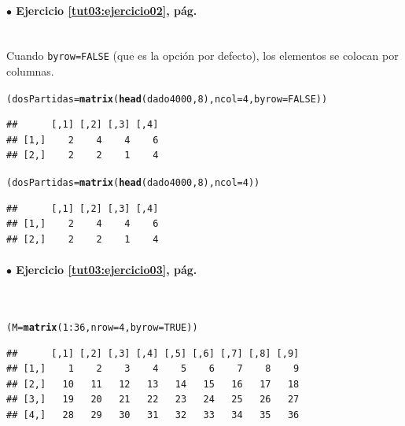 \documentclass[10pt,a4paper]{article}\usepackage[]{graphicx}\usepackage[]{color}
\makeatletter
\newcommand{\hlnum}[1]{\textcolor[rgb]{0.686,0.059,0.569}{#1}}%
\newcommand{\hlopt}[1]{\textcolor[rgb]{0,0,0}{#1}}%
\newcommand{\hlstd}[1]{\textcolor[rgb]{0.345,0.345,0.345}{#1}}%
\newcommand{\hlkwb}[1]{\textcolor[rgb]{0.69,0.353,0.396}{#1}}%
\newcommand{\hlkwc}[1]{\textcolor[rgb]{0.333,0.667,0.333}{#1}}%
\newcommand{\hlkwd}[1]{\textcolor[rgb]{0.737,0.353,0.396}{\textbf{#1}}}%
\newenvironment{kframe}{%
 \def\at@end@of@kframe{}%
 \ifinner\ifhmode%
  \def\at@end@of@kframe{\end{minipage}}%
  \begin{minipage}{\columnwidth}%
 \fi\fi%
 \def\FrameCommand##1{\hskip\@totalleftmargin \hskip-\fboxsep
 \colorbox{shadecolor}{##1}\hskip-\fboxsep
     \hskip-\linewidth \hskip-\@totalleftmargin \hskip\columnwidth}%
 \MakeFramed {\advance\hsize-\width
   \@totalleftmargin\z@ \linewidth\hsize
   \@setminipage}}%
 {\par\unskip\endMakeFramed%
 \at@end@of@kframe}
\newenvironment{knitrout}{}{} %
\makeatother
\begin{document}
\paragraph{\bf $\bullet$ Ejercicio \ref{tut03:ejercicio02}, pág. \pageref{tut03:ejercicio02}}
\label{tut03:ejercicio02:sol}\quad\\

Cuando {\tt byrow=FALSE} (que es la opción por defecto), los elementos se colocan por columnas.
\begin{knitrout}
\color{fgcolor}\begin{kframe}
\begin{alltt}
\hlstd{(dosPartidas} \hlkwb{=} \hlkwd{matrix}\hlstd{(}\hlkwd{head}\hlstd{(dado4000,} \hlnum{8}\hlstd{),} \hlkwc{ncol} \hlstd{=} \hlnum{4}\hlstd{,} \hlkwc{byrow} \hlstd{=} \hlnum{FALSE}\hlstd{))}
\end{alltt}
\begin{verbatim}
##      [,1] [,2] [,3] [,4]
## [1,]    2    4    4    6
## [2,]    2    2    1    4
\end{verbatim}
\begin{alltt}
\hlstd{(dosPartidas} \hlkwb{=} \hlkwd{matrix}\hlstd{(}\hlkwd{head}\hlstd{(dado4000,} \hlnum{8}\hlstd{),} \hlkwc{ncol} \hlstd{=} \hlnum{4}\hlstd{))}
\end{alltt}
\begin{verbatim}
##      [,1] [,2] [,3] [,4]
## [1,]    2    4    4    6
## [2,]    2    2    1    4
\end{verbatim}
\end{kframe}
\end{knitrout}


\paragraph{\bf $\bullet$ Ejercicio \ref{tut03:ejercicio03}, pág. \pageref{tut03:ejercicio03}}
\label{tut03:ejercicio03:sol}\quad\\

\begin{knitrout}
\color{fgcolor}\begin{kframe}
\begin{alltt}
\hlstd{(M} \hlkwb{=} \hlkwd{matrix}\hlstd{(}\hlnum{1}\hlopt{:}\hlnum{36}\hlstd{,} \hlkwc{nrow}\hlstd{=}\hlnum{4}\hlstd{,} \hlkwc{byrow}\hlstd{=}\hlnum{TRUE}\hlstd{) )}
\end{alltt}
\begin{verbatim}
##      [,1] [,2] [,3] [,4] [,5] [,6] [,7] [,8] [,9]
## [1,]    1    2    3    4    5    6    7    8    9
## [2,]   10   11   12   13   14   15   16   17   18
## [3,]   19   20   21   22   23   24   25   26   27
## [4,]   28   29   30   31   32   33   34   35   36
\end{verbatim}
\end{kframe}
\end{knitrout}
\end{document}
